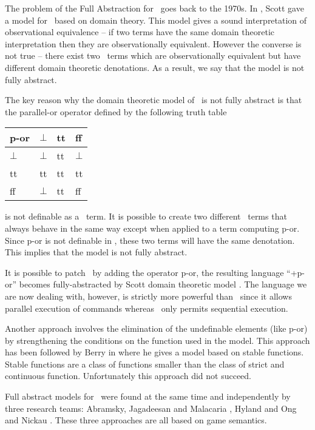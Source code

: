 The problem of the Full Abstraction for \pcf\ goes back to the
1970s. In \citep{scott93}, Scott gave a model for \pcf\ based on
domain theory. This model gives a sound interpretation of
observational equivalence -- if two terms have the same domain
theoretic interpretation then they are observationally equivalent.
However the converse is not true -- there exist two \pcf\ terms
which are observationally equivalent but have different domain
theoretic denotations. As a result, we say that the model is not
fully abstract.

The key reason why the domain theoretic model of \pcf\ is not fully
abstract is that the parallel-or operator defined by the following
truth table
\begin{center}
\begin{tabular}{l|lll}
p-or  & $\bot$ & tt & ff \\ \hline
$\bot$ & $\bot$ & tt & $\bot$\\
tt & tt & tt & tt\\
ff & $\bot$ & tt & ff\\
\end{tabular}
\end{center}
is not definable as a \pcf\ term. It is possible to create two
different \pcf\ terms that always behave in the same way except when
applied to a term computing p-or. Since p-or is not definable in
\pcf, these two terms will have the same denotation. This implies
that the model is not fully abstract.


It is possible to patch \pcf\ by adding the operator p-or, the
resulting language ``\pcf+p-or'' becomes fully-abstracted by Scott
domain theoretic model \citep{DBLP:journals/tcs/Plotkin77}. The language we are now dealing with, however,
is strictly more powerful than
\pcf\ since it allows parallel execution of commands whereas \pcf\
only permits sequential execution.

Another approach involves the elimination of the undefinable
elements (like p-or) by strengthening the conditions on the function
used in the model. This approach has been followed by Berry in
\cite{berry-stable,gberry-thesis} where he gives a model based on
stable functions. Stable functions are a class of functions smaller
than the class of strict and continuous function. Unfortunately this
approach did not succeed.

Full abstract models for \pcf\ were found at the same time and independently by three research teams: Abramsky, Jagadeesan and Malacaria \citep{abramsky94full}, Hyland and Ong \citep{hylandong_pcf} and Nickau \citep{Nickau:lfcs94}. These three approaches are all based on game semantics.

